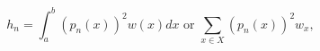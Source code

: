 \[h_{n}=\int_{a}^{b}\left(p_{n}(x)\right)^{2}w(x)dx\text{ or }\sum_{x\in X}\left%
(p_{n}(x)\right)^{2}w_{x},\]